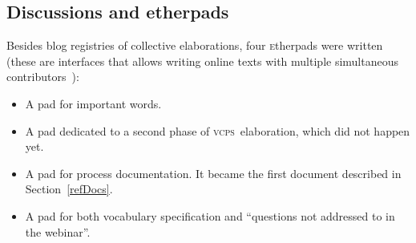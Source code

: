 \documentclass[10pt,letterpaper]{article}
\newcommand{\vcps}{\textsc{vcps}}
\newcommand{\etherpad}{\textsc{e}therpad}
\begin{document}
\subsection{Discussions and etherpads}
Besides blog registries of collective elaborations, four \etherpad s
were written~\cite{etherpads} 
(these are interfaces that allows writing online texts with multiple simultaneous contributors~\cite{etherpads2}):
\begin{itemize}
    \item A pad for important words.
    \item A pad dedicated to a second phase of \vcps\ elaboration, which did not happen yet.
    \item A pad for process documentation. It became the first document described in Section~\ref{refDocs}. 
    \item A pad for both vocabulary specification and ``questions not addressed to in the webinar''.
\end{itemize}
 


\end{document}
